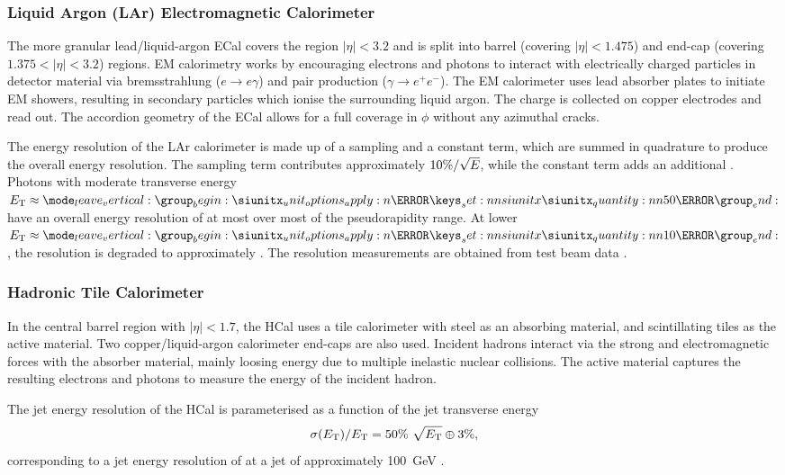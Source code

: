 \subsubsection{Liquid Argon (LAr) Electromagnetic Calorimeter}
The more granular lead/liquid-argon ECal covers the region $|\eta|< 3.2$ and is split into barrel (covering $|\eta| < 1.475$) and end-cap (covering $1.375 < |\eta| < 3.2$) regions.
EM calorimetry works by encouraging electrons and photons to interact with electrically charged particles in detector material via bremsstrahlung ($e \rightarrow e\gamma$) and pair production ($\gamma \rightarrow e^+ e^- $).
The EM calorimeter uses lead absorber plates to initiate EM showers, resulting in secondary particles which ionise the surrounding liquid argon.
The charge is collected on copper electrodes and read out.
The accordion geometry of the ECal allows for a full coverage in $\phi$ without any azimuthal cracks.

The energy resolution of the LAr calorimeter is made up of a sampling and a constant term, which are summed in quadrature to produce the overall energy resolution.
The sampling term contributes approximately $10\% / \sqrt{E}$, while the constant term adds an additional .
Photons with moderate transverse energy $\ET \approx \SI{50}{\GeV}$ have an overall energy resolution of at most  over most of the pseudorapidity range.
At lower $\ET \approx \SI{10}{\GeV}$, the resolution is degraded to approximately .
The resolution measurements are obtained from test beam data \cite{ATLAS-TDR-14}.


\subsubsection{Hadronic Tile Calorimeter}
In the central barrel region with $|\eta| < 1.7$, the HCal uses a tile calorimeter with steel as an absorbing material, and scintillating tiles as the active material.
Two copper/liquid-argon calorimeter end-caps are also used.
Incident hadrons interact via the strong and electromagnetic forces with the absorber material, mainly loosing energy due to multiple inelastic nuclear collisions.
The active material captures the resulting electrons and photons to measure the energy of the incident hadron.

The jet energy resolution of the HCal is parameterised as a function of the jet transverse energy
%
\begin{equation}
  \sigma(E_{\text{T}}) / E_{\text{T}} = 50\% \ \sqrt{E_{\text{T}}} \oplus 3\% ,
\end{equation}
%
corresponding to a jet energy resolution of  at a jet \pt of approximately \SI{100}{\GeV} \cite{ATLAS-TDR-03}.

